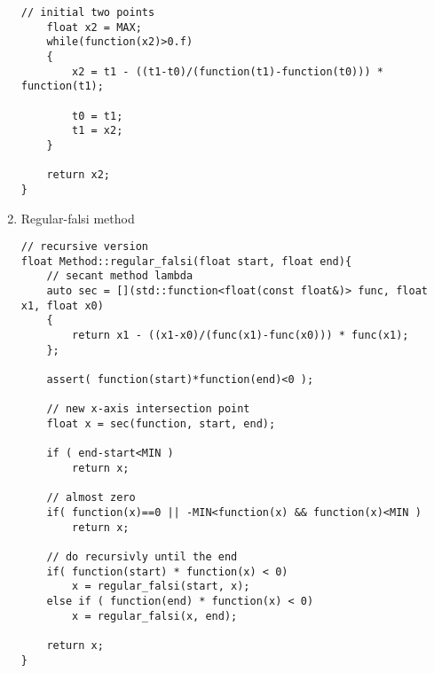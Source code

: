 \documentclass[12pt,letterpaper]{article}
\begin{document}
\begin{enumerate}
\begin{lstlisting}[style=C++]
    // initial two points
    float x2 = MAX;
    while(function(x2)>0.f)
    {
        x2 = t1 - ((t1-t0)/(function(t1)-function(t0))) * function(t1);

        t0 = t1;
        t1 = x2;
    }

    return x2;
}
\end{lstlisting}

\newpage

\item Regular-falsi method
\begin{lstlisting}[style=C++]
// recursive version
float Method::regular_falsi(float start, float end){
    // secant method lambda
    auto sec = [](std::function<float(const float&)> func, float x1, float x0)
    { 
        return x1 - ((x1-x0)/(func(x1)-func(x0))) * func(x1); 
    };

    assert( function(start)*function(end)<0 );

    // new x-axis intersection point
    float x = sec(function, start, end);

    if ( end-start<MIN )
        return x;
    
    // almost zero
    if( function(x)==0 || -MIN<function(x) && function(x)<MIN ) 
        return x;

    // do recursivly until the end
    if( function(start) * function(x) < 0)
        x = regular_falsi(start, x);
    else if ( function(end) * function(x) < 0)
        x = regular_falsi(x, end);

    return x;
}
\end{lstlisting}

\end{enumerate}
\end{document}
